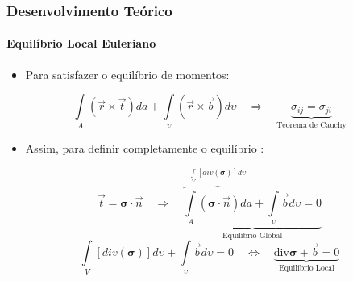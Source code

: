 \documentclass{beamer}
\begin{document}
\begin{frame}
    \frametitle{Desenvolvimento Teórico}
        \framesubtitle{Equilíbrio Local Euleriano}
        \begin{itemize}
            \item Para satisfazer o equilíbrio de momentos:
        \end{itemize}

        \begin{equation}
            \int\limits_{A} \left(\vec{r} \times \vec{t}\right) da  + \int\limits_{\upsilon} \left(\vec{r} \times \vec{b}\right) d\upsilon  \quad \Rightarrow \quad \underbrace{\sigma_{ij} = \sigma_{ji}}_{\text{Teorema de Cauchy}}
        \end{equation}
        \begin{itemize}
            \item Assim, para definir completamente o equilíbrio :
        \end{itemize}

        \begin{equation}
             \vec{t} = \boldsymbol{\sigma} \cdot \vec{n} \quad \Rightarrow \quad \underbrace{\overbrace{\int\limits_{A} \left(\boldsymbol{\sigma} \cdot \vec{n}\right) da }^{\int\limits_{V} \left[div(\boldsymbol{\sigma})\right] d\upsilon} + \int\limits_{\upsilon} \vec{b}  d\upsilon = 0 }_{\text{Equilíbrio Global}}
        \end{equation}
        \begin{equation}
            \int\limits_{V} \left[div(\boldsymbol{\sigma})\right] d\upsilon + \int\limits_{\upsilon} \vec{b}  d\upsilon = 0 \quad \Leftrightarrow  \quad \underbrace{\text{div} \boldsymbol{\sigma}  + \vec{b} = 0}_{\text{Equilíbrio Local}}
        \end{equation}


\end{frame}
\end{document}
